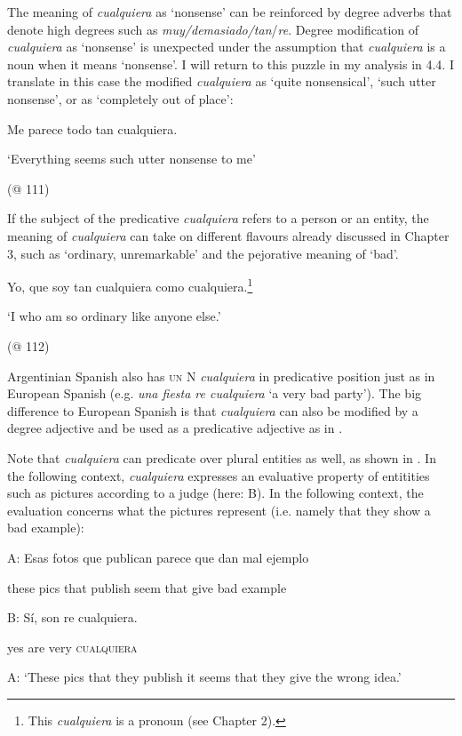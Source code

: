 \documentclass[output=paper]{langscibook}
\begin{document}
  The meaning of \textit{cualquiera} as ‘nonsense’ can be reinforced by degree adverbs that denote high degrees such as \textit{muy/demasiado/tan}/\textit{re}. Degree modification of \textit{cualquiera} as ‘nonsense’ is unexpected under the assumption that \textit{cualquiera} is a noun when it means ‘nonsense’. I will return to this puzzle in my analysis in 4.4. I translate in this case the modified \textit{cualquiera} as ‘quite nonsensical’, ‘such utter nonsense’, or as ‘completely out of place’:

    Me parece todo tan cualquiera.

‘Everything seems such utter nonsense to me’

(@ 111)

If the subject of the predicative \textit{cualquiera} refers to a person or an entity, the meaning of \textit{cualquiera} can take on different flavours already discussed in Chapter 3, such as ‘ordinary, unremarkable’ and the pejorative meaning of ‘bad’. 

    Yo, que soy tan cualquiera como cualquiera.\footnote{This \textit{cualquiera} is a pronoun (see Chapter 2).}

‘I who am so ordinary like anyone else.’

    (@ 112)

Argentinian Spanish also has \textsc{un} N \textit{cualquiera} in predicative position just as in European Spanish (e.g. \textit{una fiesta re cualquiera} ‘a very bad party’). The big difference to European Spanish is that \textit{cualquiera} can also be modified by a degree adjective and be used as a predicative adjective as in .

  Note that \textit{cualquiera} can predicate over plural entities as well, as shown in . In the following context, \textit{cualquiera} expresses an evaluative property of entitities such as pictures according to a judge (here: B). In the following context, the evaluation concerns what the pictures represent (i.e. namely that they show a bad example):

\label{bkm:Ref150786385}  A:  Esas  fotos  que  publican  parece  que  dan  mal  ejemplo

    these  pics  that  publish  seem  that  give  bad  example

  B:  Sí,  son  re  cualquiera.

    yes  are  very  \textsc{cualquiera}

  A: ‘These pics that they publish it seems that they give the wrong idea.’
\end{document}
